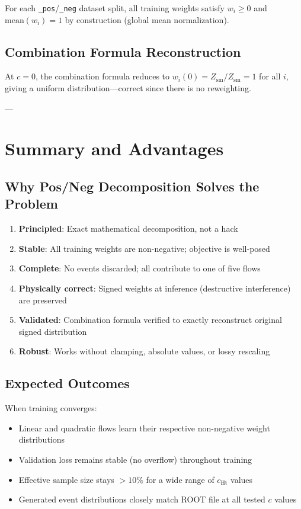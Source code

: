\documentclass[11pt,a4paper]{article}
\begin{document}
For each \texttt{\_pos}/\texttt{\_neg} dataset split, all training weights satisfy $w_i \geq 0$ and 
$\text{mean}(w_i) = 1$ by construction (global mean normalization).

\subsection{Combination Formula Reconstruction}

At $c = 0$, the combination formula reduces to $w_i(0) = Z_{\text{sm}} / Z_{\text{sm}} = 1$ for all $i$, 
giving a uniform distribution—correct since there is no reweighting.

---

\section{Summary and Advantages}

\subsection{Why Pos/Neg Decomposition Solves the Problem}

\begin{enumerate}
  \item \textbf{Principled}: Exact mathematical decomposition, not a hack
  \item \textbf{Stable}: All training weights are non-negative; objective is well-posed
  \item \textbf{Complete}: No events discarded; all contribute to one of five flows
  \item \textbf{Physically correct}: Signed weights at inference (destructive interference) are preserved
  \item \textbf{Validated}: Combination formula verified to exactly reconstruct original signed distribution
  \item \textbf{Robust}: Works without clamping, absolute values, or lossy rescaling
\end{enumerate}

\subsection{Expected Outcomes}

When training converges:
\begin{itemize}
  \item Linear and quadratic flows learn their respective non-negative weight distributions
  \item Validation loss remains stable (no overflow) throughout training
  \item Effective sample size stays $> 10\%$ for a wide range of $c_{\text{Ht}}$ values
  \item Generated event distributions closely match ROOT file at all tested $c$ values
\end{itemize}
\end{document}
